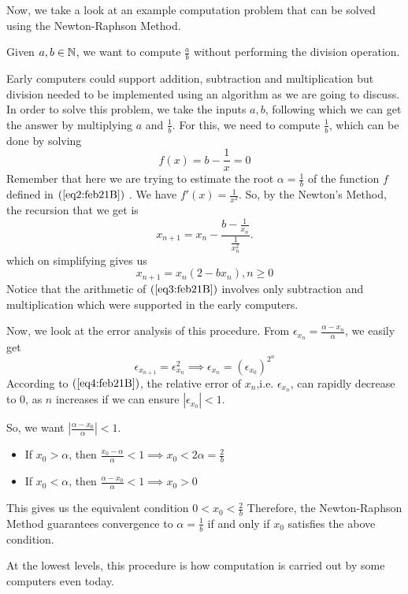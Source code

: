 	Now, we take a look at an example computation problem that can be solved using the Newton-Raphson Method.

	Given $a,b \in \mathbb{N}$, we want to compute $\frac{a}{b}$ without performing the division operation.
	
	Early computers could support addition, subtraction and multiplication but division needed to be implemented using an algorithm as we are going to discuss.
	In order to solve this problem, we take the inputs $a,b$, following which we can get the answer by multiplying  $a$ and  $\frac{1}{b}$. For this, we need to compute $\frac{1}{b}$, which can be done by solving 
\begin{equation}\label{eq2:feb21B}
	f(x) = b - \frac{1}{x} = 0 
\end{equation}
Remember that here we are trying to estimate the root $\alpha = \frac{1}{b}$ of the function $f$ defined in $\left( \ref{eq2:feb21B}\right) $ . 
	We have $f'(x) = \frac{1}{x^2}$. So, by the Newton's Method, the recursion that we get is 
	\[
		x_{n+1} = x_n - \frac{b-\frac{1}{x_n}}{\frac{1}{x_n^2}}
	.\] 
	which on simplifying gives us
	\begin{equation}\label{eq3:feb21B}
		x_{n+1} = x_n\left( 2-bx_n \right), n \geq 0 
	\end{equation}
	Notice that the arithmetic of $\left( \ref{eq3:feb21B} \right) $ involves only subtraction and multiplication which were supported in the early computers.

	Now, we look at the error analysis of this procedure.
	From $\epsilon_{x_n} = \frac{\alpha-x_n}{\alpha}$, we easily get
	\begin{equation}\label{eq4:feb21B}
	 \epsilon_{x_{n+1}} = \epsilon_{x_n}^2 \implies \epsilon_{x_n} = \left( \epsilon_{x_0} \right)^{2^n} 
 \end{equation}
 According to $\left( \ref{eq4:feb21B} \right) $, the relative error of $x_n$,i.e. $\epsilon_{x_n}$, can rapidly decrease to $0$, as $n$ increases if we can ensure $|\epsilon_{x_0}| < 1$.

	So, we want $|\frac{\alpha - x_0}{\alpha}| < 1$.
	\begin{itemize}
		\item If $x_0 > \alpha$, then  $\frac{x_0-\alpha}{\alpha} < 1 \implies x_0 < 2\alpha = \frac{2}{b}$\\
		\item If $ x_0 < \alpha$, then $\frac{\alpha - x_0}{\alpha} < 1 \implies x_0 > 0$
	\end{itemize}
	This gives us the equivalent condition $0 < x_0 < \frac{2}{b}$ 
	Therefore, the Newton-Raphson Method guarantees convergence to $\alpha = \frac{1}{b}$ if and only if $x_0$ satisfies the above condition.

	At the lowest levels, this procedure is how computation is carried out by some computers even today.
